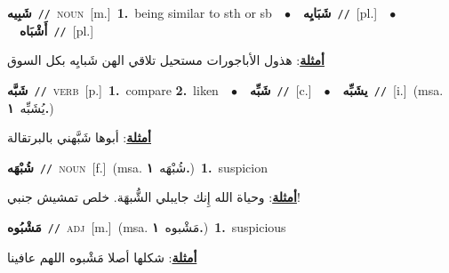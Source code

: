 \documentclass[10pt,a4paper,twoside]{article} %
\begin{document}
\begin{multicols}{2}
{\setlength\topsep{0pt}\textbf{\foreignlanguage{arabic}{شَبِيه}}\ {\color{gray}\texttt{//}\color{black}}\ \textsc{noun}\ [m.]\ \textbf{1.}~being similar to sth or sb\ \ $\bullet$\ \ \setlength\topsep{0pt}\textbf{\foreignlanguage{arabic}{شَبَايِه}}\ {\color{gray}\texttt{//}\color{black}}\ [pl.]\ \ $\bullet$\ \ \setlength\topsep{0pt}\textbf{\foreignlanguage{arabic}{أَشْبَاه}}\ {\color{gray}\texttt{//}\color{black}}\ [pl.]\  \begin{flushright}\color{gray}\foreignlanguage{arabic}{\textbf{\underline{\foreignlanguage{arabic}{أمثلة}}}: هذول الأباجورات مستحيل تلاقي الهن شَبايِه بكل السوق}\end{flushright}\color{black}} \vspace{2mm}

{\setlength\topsep{0pt}\textbf{\foreignlanguage{arabic}{شَبَّه}}\ {\color{gray}\texttt{//}\color{black}}\ \textsc{verb}\ [p.]\ \textbf{1.}~compare  \textbf{2.}~liken\ \ $\bullet$\ \ \setlength\topsep{0pt}\textbf{\foreignlanguage{arabic}{شَبِّه}}\ {\color{gray}\texttt{//}\color{black}}\ [c.]\ \ $\bullet$\ \ \setlength\topsep{0pt}\textbf{\foreignlanguage{arabic}{يشَبِّه}}\ {\color{gray}\texttt{//}\color{black}}\ [i.]\ \color{gray}(msa. \foreignlanguage{arabic}{يُشَبِّه}~\foreignlanguage{arabic}{\textbf{١.}})\color{black}\  \begin{flushright}\color{gray}\foreignlanguage{arabic}{\textbf{\underline{\foreignlanguage{arabic}{أمثلة}}}: أبوها شَبَّهني بالبرتقالة}\end{flushright}\color{black}} \vspace{2mm}

{\setlength\topsep{0pt}\textbf{\foreignlanguage{arabic}{شُبْهَه}}\ {\color{gray}\texttt{//}\color{black}}\ \textsc{noun}\ [f.]\ \color{gray}(msa. \foreignlanguage{arabic}{شُبْهَه}~\foreignlanguage{arabic}{\textbf{١.}})\color{black}\ \textbf{1.}~suspicion\  \begin{flushright}\color{gray}\foreignlanguage{arabic}{\textbf{\underline{\foreignlanguage{arabic}{أمثلة}}}: وحياة الله إِنك جايبلي الشُّبهَة. خلص تمشيش جنبي!}\end{flushright}\color{black}} \vspace{2mm}

{\setlength\topsep{0pt}\textbf{\foreignlanguage{arabic}{مَشْبُوه}}\ {\color{gray}\texttt{//}\color{black}}\ \textsc{adj}\ [m.]\ \color{gray}(msa. \foreignlanguage{arabic}{مَشْبوه}~\foreignlanguage{arabic}{\textbf{١.}})\color{black}\ \textbf{1.}~suspicious\  \begin{flushright}\color{gray}\foreignlanguage{arabic}{\textbf{\underline{\foreignlanguage{arabic}{أمثلة}}}: شكلها أصلا مَشْبوه اللهم عافينا}\end{flushright}\color{black}} \vspace{2mm}


\end{multicols}
\end{document}
